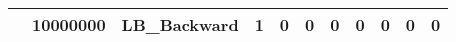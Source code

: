 \begin{table}[h]
\begin{tabular}{cccllllllll}
\rowcolor[HTML]{D9E1F2} 
\multicolumn{1}{|c|}{\cellcolor[HTML]{D9E1F2}128} & \multicolumn{1}{c|}{\cellcolor[HTML]{D9E1F2}10000000} & \multicolumn{1}{c|}{\cellcolor[HTML]{D9E1F2}LB\_Backward} & \multicolumn{1}{l|}{\cellcolor[HTML]{D9E1F2}1} & \multicolumn{1}{l|}{\cellcolor[HTML]{D9E1F2}0} & \multicolumn{1}{l|}{\cellcolor[HTML]{D9E1F2}0} & \multicolumn{1}{l|}{\cellcolor[HTML]{D9E1F2}0} & \multicolumn{1}{l|}{\cellcolor[HTML]{D9E1F2}0} & \multicolumn{1}{l|}{\cellcolor[HTML]{D9E1F2}0} & \multicolumn{1}{l|}{\cellcolor[HTML]{D9E1F2}0} & \multicolumn{1}{l|}{\cellcolor[HTML]{D9E1F2}0} \\ \hline
\end{tabular}
\end{table}